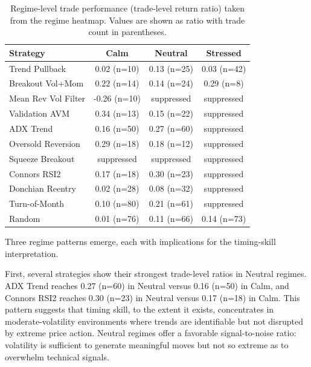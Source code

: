 \documentclass[preprint,12pt]{elsarticle}
\theoremstyle{definition}
\begin{document}
\begin{table}[htbp]
\centering
\caption{Regime-level trade performance (trade-level return ratio) taken from the regime heatmap. Values are shown as ratio with trade count in parentheses.}
\label{tab:regimes}
\small
\renewcommand{\arraystretch}{1.1}
\begin{tabular}{lccc}
\toprule
Strategy & Calm & Neutral & Stressed \\
\midrule
Trend Pullback      & 0.02 (n=10) & 0.13 (n=25) & 0.03 (n=42) \\
Breakout Vol+Mom    & 0.22 (n=14) & 0.14 (n=24) & 0.29 (n=8) \\
Mean Rev Vol Filter & -0.26 (n=10) & suppressed & suppressed \\
Validation AVM      & 0.34 (n=13) & 0.15 (n=22) & suppressed \\
ADX Trend           & 0.16 (n=50) & 0.27 (n=60) & suppressed \\
Oversold Reversion  & 0.29 (n=18) & 0.18 (n=12) & suppressed \\
Squeeze Breakout    & suppressed & suppressed & suppressed \\
Connors RSI2        & 0.17 (n=18) & 0.30 (n=23) & suppressed \\
Donchian Reentry    & 0.02 (n=28) & 0.08 (n=32) & suppressed \\
Turn-of-Month       & 0.10 (n=80) & 0.21 (n=61) & suppressed \\
Random              & 0.01 (n=76) & 0.11 (n=66) & 0.14 (n=73) \\
\bottomrule
\end{tabular}
\end{table}

Three regime patterns emerge, each with implications for the timing-skill interpretation.

First, several strategies show their strongest trade-level ratios in Neutral regimes. ADX Trend reaches 0.27 (n=60) in Neutral versus 0.16 (n=50) in Calm, and Connors RSI2 reaches 0.30 (n=23) in Neutral versus 0.17 (n=18) in Calm. This pattern suggests that timing skill, to the extent it exists, concentrates in moderate-volatility environments where trends are identifiable but not disrupted by extreme price action. Neutral regimes offer a favorable signal-to-noise ratio: volatility is sufficient to generate meaningful moves but not so extreme as to overwhelm technical signals.
\end{document}
